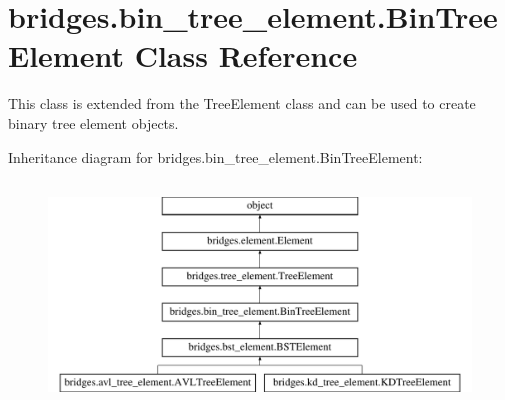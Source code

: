 \hypertarget{classbridges_1_1bin__tree__element_1_1_bin_tree_element}{}\section{bridges.\+bin\+\_\+tree\+\_\+element.\+Bin\+Tree\+Element Class Reference}
\label{classbridges_1_1bin__tree__element_1_1_bin_tree_element}


This class is extended from the Tree\+Element class and can be used to create binary tree element objects.  


Inheritance diagram for bridges.\+bin\+\_\+tree\+\_\+element.\+Bin\+Tree\+Element\+:\begin{figure}[H]
\begin{center}
\leavevmode
\includegraphics[height=6.000000cm]{classbridges_1_1bin__tree__element_1_1_bin_tree_element}
\end{center}
\end{figure}
